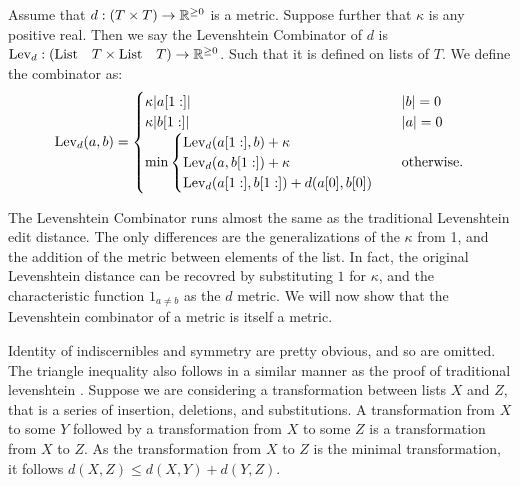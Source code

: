 \begin{definition}
Assume that $d : (T \times T) \to \mathbb{R}^{\ge 0}$ is a metric.
Suppose further that $\kappa$ is any positive real.
Then we say the Levenshtein Combinator of $d$ is  $\text{Lev}_{d} : (\text{List}\quad T \times \text{List}\quad T) \to \mathbb{R}^{\ge 0}$.
Such that it is defined on lists of $T$.
We define the combinator as: 
$$ \lev{d}(a, b) = \begin{cases} 
    \kappa | \tail{a} | & |b| = 0 \\
    \kappa | \tail{b} | & |a| = 0 \\ 
    \text{min} \begin{cases}
        \lev{d}(\tail{a}, b) + \kappa \\
        \lev{d}(a, \tail{b}) + \kappa \\
        \lev{d}(\tail{a}, \tail{b}) + d(\head{a}, \head{b})  %
    \end{cases} & \otw
\end{cases}$$
\end{definition}

The Levenshtein Combinator runs almost the same as the traditional Levenshtein edit distance.
The only differences are the generalizations of the $\kappa$ from 1,
and the addition of the metric between elements of the list.
In fact, the original Levenshtein distance can be recovred by substituting $1$ for $\kappa$,
and the characteristic function $1_{a \neq b}$ as the $d$ metric.
We will now show that the Levenshtein combinator of a metric is itself a metric. 

Identity of indiscernibles and symmetry are pretty obvious, and so are omitted.
The triangle inequality also follows in a similar manner as the proof of traditional levenshtein \cite{j2kun_2014}.
Suppose we are considering a transformation between lists $X$ and $Z$,
that is a series of insertion, deletions, and substitutions.
A transformation from $X$ to some $Y$ followed by a transformation from $X$ to some $Z$
is a transformation from $X$ to $Z$.
As the transformation from $X$ to $Z$ is the minimal transformation,
it follows $d(X, Z) \le d(X, Y) + d(Y, Z)$.
